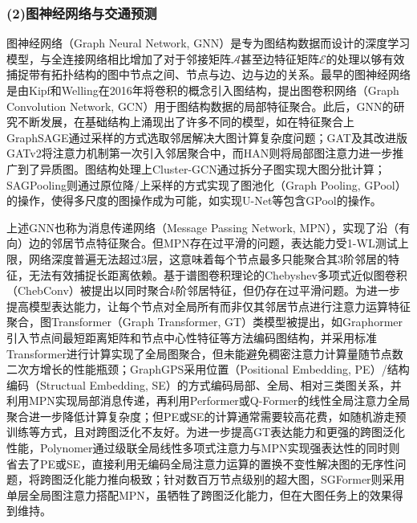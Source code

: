     \subsubsection*{(2)图神经网络与交通预测}
      图神经网络（Graph Neural Network, GNN）是专为图结构数据而设计的深度学习模型，与全连接网络相比增加了对于邻接矩阵$\mathcal{A}$甚至边特征矩阵$\mathcal{E}$的处理以够有效捕捉带有拓扑结构的图中节点之间、节点与边、边与边的关系。最早的图神经网络是由Kipf和Welling在2016年\cite{GCN2017original}将卷积的概念引入图结构，提出图卷积网络（Graph Convolution Network, GCN）用于图结构数据的局部特征聚合。此后，GNN的研究不断发展，在基础结构上涌现出了许多不同的模型，如在特征聚合上GraphSAGE\cite{GraphSAGE2017}通过采样的方式选取邻居解决大图计算复杂度问题；GAT\cite{GAT2018original}及其改进版GATv2\cite{GATv2_2022}将注意力机制第一次引入邻居聚合中，而HAN\cite{HAN2019}则将局部图注意力进一步推广到了异质图。图结构处理上Cluster-GCN\cite{Cluster_GCN}通过拆分子图实现大图分批计算；SAGPooling\cite{SAGPooling2019}则通过原位降/上采样的方式实现了图池化（Graph Pooling, GPool）的操作，使得多尺度的图操作成为可能，如实现U-Net\cite{U_net2015original}等包含GPool的操作。
      
      上述GNN也称为消息传递网络（Message Passing Network, MPN），实现了沿（有向）边的邻居节点特征聚合。但MPN存在过平滑的问题，表达能力受1-WL测试上限，网络深度普遍无法超过3层，这意味着每个节点最多只能聚合其3阶邻居的特征，无法有效捕捉长距离依赖。基于谱图卷积理论的Chebyshev多项式近似图卷积（ChebConv）被提出以同时聚合$k$阶邻居特征，但仍存在过平滑问题。为进一步提高模型表达能力，让每个节点对全局所有而非仅其邻居节点进行注意力运算特征聚合，图Transformer（Graph Transformer, GT）类模型被提出，如Graphormer\cite{Graphormer2021}引入节点间最短距离矩阵和节点中心性特征等方法编码图结构，并采用标准Transformer进行计算实现了全局图聚合，但未能避免稠密注意力计算量随节点数二次方增长的性能瓶颈；GraphGPS采用位置（Positional Embedding, PE）/结构编码（Structual Embedding, SE）的方式编码局部、全局、相对三类图关系，并利用MPN实现局部消息传递，再利用Performer\cite{Performer2022}或Q-Former\cite{BLIP_2_Q_Former2023}的线性全局注意力全局聚合进一步降低计算复杂度；但PE或SE的计算通常需要较高花费，如随机游走预训练等方式，且对跨图泛化不友好。为进一步提高GT表达能力和更强的跨图泛化性能，Polynomer\cite{Polynomer2024}通过级联全局线性多项式注意力与MPN实现强表达性的同时则省去了PE或SE，直接利用无编码全局注意力运算的置换不变性解决图的无序性问题，将跨图泛化能力推向极致；针对数百万节点级别的超大图，SGFormer则采用单层全局图注意力搭配MPN，虽牺牲了跨图泛化能力，但在大图任务上的效果得到维持。

